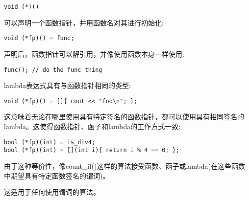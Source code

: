 \begin{lstlisting}[style=styleCXX]
void (*)()
\end{lstlisting}

可以声明一个函数指针，并用函数名对其进行初始化:

\begin{lstlisting}[style=styleCXX]
void (*fp)() = func;
\end{lstlisting}

声明后，函数指针可以解引用，并像使用函数本身一样使用:

\begin{lstlisting}[style=styleCXX]
func(); // do the func thing
\end{lstlisting}

lambda表达式具有与函数指针相同的类型:

\begin{lstlisting}[style=styleCXX]
void (*fp)() = []{ cout << "foo\n"; };
\end{lstlisting}

这意味着无论在哪里使用具有特定签名的函数指针，都可以使用具有相同签名的lambda。这使得函数指针、函子和lambda的工作方式一致:

\begin{lstlisting}[style=styleCXX]
bool (*fp)(int) = is_div4;
bool (*fp)(int) = [](int i){ return i % 4 == 0; };
\end{lstlisting}

由于这种等价性，像count\_if()这样的算法接受函数、函子或lambda(在这些函数中期望具有特定函数签名的谓词)。

这适用于任何使用谓词的算法。





